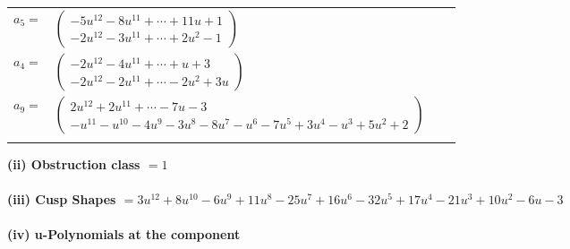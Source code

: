 \documentclass[1p]{elsarticle_modified}
\theoremstyle{definition}
\begin{document}
\begin{tabular}{m{7pt} m{180pt} m{7pt} m{180pt} }
\flushright $a_{5}=$&$\begin{pmatrix}-5 u^{12}-8 u^{11}+\cdots+11 u+1\\-2 u^{12}-3 u^{11}+\cdots+2 u^2-1\end{pmatrix}$ \\
\flushright $a_{4}=$&$\begin{pmatrix}-2 u^{12}-4 u^{11}+\cdots+u+3\\-2 u^{12}-2 u^{11}+\cdots-2 u^2+3 u\end{pmatrix}$ \\
\flushright $a_{9}=$&$\begin{pmatrix}2 u^{12}+2 u^{11}+\cdots-7 u-3\\- u^{11}- u^{10}-4 u^9-3 u^8-8 u^7- u^6-7 u^5+3 u^4- u^3+5 u^2+2\end{pmatrix}$\\&\end{tabular}
\flushleft \textbf{(ii) Obstruction class $= 1$}\\~\\
\flushleft \textbf{(iii) Cusp Shapes $= 3 u^{12}+8 u^{10}-6 u^9+11 u^8-25 u^7+16 u^6-32 u^5+17 u^4-21 u^3+10 u^2-6 u-3$}\\~\\
\newpage\renewcommand{\arraystretch}{1}
\flushleft \textbf{(iv) u-Polynomials at the component}\newline \\
\end{document}
